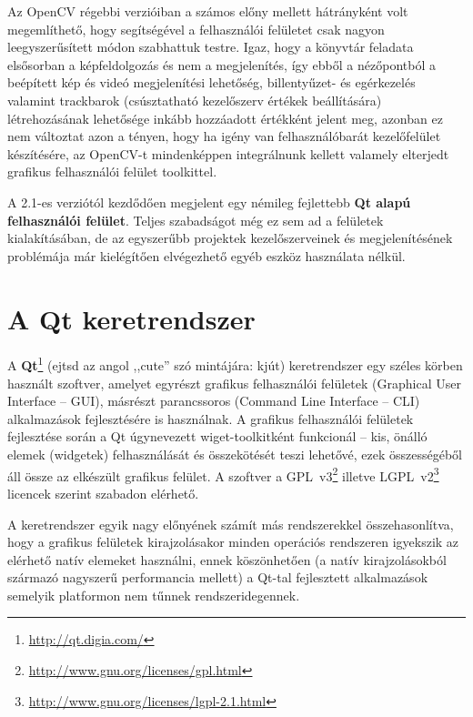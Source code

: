 Az OpenCV régebbi verzióiban a számos előny mellett hátrányként volt megemlíthető, hogy segítségével a felhasználói felületet csak nagyon leegyszerűsített módon szabhattuk testre. Igaz, hogy a könyvtár feladata elsősorban a képfeldolgozás és nem a megjelenítés, így ebből a nézőpontból a beépített kép és videó megjelenítési lehetőség, billentyűzet- és egérkezelés valamint trackbarok (csúsztatható kezelőszerv értékek beállítására) létrehozásának lehetősége inkább hozzáadott értékként jelent meg, azonban ez nem változtat azon a tényen, hogy ha igény van felhasználóbarát kezelőfelület készítésére, az OpenCV-t mindenképpen integrálnunk kellett valamely elterjedt grafikus felhasználói felület toolkittel.

A 2.1-es verziótól kezdődően megjelent egy némileg fejlettebb \textbf{Qt alapú felhasználói felület}. Teljes szabadságot még ez sem ad a felületek kialakításában, de az egyszerűbb projektek kezelőszerveinek és megjelenítésének problémája már kielégítően elvégezhető egyéb eszköz használata nélkül.

\section{A Qt keretrendszer}\label{sect:qt}

A \textbf{Qt}\footnote{\url{http://qt.digia.com/}} (ejtsd az angol ,,cute'' szó mintájára: kjút) keretrendszer egy széles körben használt szoftver, amelyet egyrészt grafikus felhasználói felületek (Graphical User Interface -- GUI), másrészt parancssoros (Command Line Interface -- CLI) alkalmazások fejlesztésére is használnak. A grafikus felhasználói felületek fejlesztése során a Qt úgynevezett wiget-toolkitként funkcionál -- kis, önálló elemek (widgetek) felhasználását és összekötését teszi lehetővé, ezek összességéből áll össze az elkészült grafikus felület. A szoftver a  GPL~v3\footnote{\url{http://www.gnu.org/licenses/gpl.html}} illetve LGPL~v2\footnote{\url{http://www.gnu.org/licenses/lgpl-2.1.html}} licencek szerint szabadon elérhető. \cite{qt_wiki}

A keretrendszer egyik nagy előnyének számít más rendszerekkel összehasonlítva, hogy a grafikus felületek kirajzolásakor minden operációs rendszeren igyekszik az elérhető natív elemeket használni, ennek köszönhetően (a natív kirajzolásokból származó nagyszerű performancia mellett) a Qt-tal fejlesztett alkalmazások semelyik platformon nem tűnnek rendszeridegennek.

